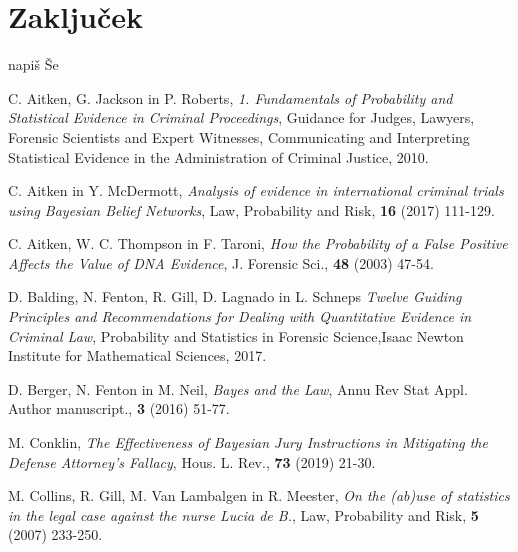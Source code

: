 \documentclass[12pt,a4paper]{amsart}
\theoremstyle{definition} %
\theoremstyle{plain} %
\begin{document}
\section{Zaključek}
napiš Še
\pagebreak

\begin{thebibliography}{99}
        C. Aitken, G. Jackson in P. Roberts, \emph{1. Fundamentals of Probability and Statistical Evidence in Criminal Proceedings}, Guidance for Judges, Lawyers, Forensic Scientists and Expert Witnesses, Communicating and Interpreting Statistical Evidence in the Administration of Criminal Justice, 2010.

        C. Aitken in Y. McDermott, \emph{Analysis of evidence in international criminal trials using Bayesian Belief Networks}, Law, Probability and Risk, \textbf{16} (2017) 111-129.

        C. Aitken, W. C. Thompson in F. Taroni, \emph{How the Probability of a False Positive Affects the Value of DNA Evidence}, J. Forensic Sci., \textbf{48} (2003) 47-54.

        D. Balding, N. Fenton, R. Gill, D. Lagnado in L. Schneps \emph{Twelve Guiding Principles and Recommendations for Dealing with Quantitative Evidence in Criminal Law}, Probability and Statistics in Forensic Science,Isaac Newton Institute for Mathematical Sciences, 2017.

        D. Berger, N. Fenton in M. Neil, \emph{Bayes and the Law}, Annu Rev Stat Appl. Author manuscript., \textbf{3} (2016) 51-77.

        M. Conklin, \emph{The Effectiveness of Bayesian Jury Instructions in Mitigating the Defense Attorney's Fallacy}, Hous. L. Rev., \textbf{73} (2019) 21-30.

        M. Collins, R. Gill, M. Van Lambalgen in R. Meester, \emph{On the (ab)use of statistics in the legal case against the nurse Lucia de B.}, Law, Probability and Risk, \textbf{5} (2007) 233-250.


\end{thebibliography}
\end{document}
